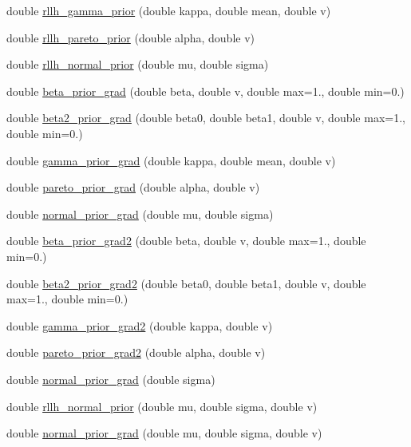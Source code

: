 \begin{DoxyCompactItemize}
double \hyperlink{namespacemappel_ac76807de851d24f1b720629ad9062cb2}{rllh\+\_\+gamma\+\_\+prior} (double kappa, double mean, double v)
\item 
double \hyperlink{namespacemappel_a2a07cb3a2c6ccd588241807747f3bd56}{rllh\+\_\+pareto\+\_\+prior} (double alpha, double v)
\item 
double \hyperlink{namespacemappel_a83c043a3c96a38aff92e40445f1ffd7a}{rllh\+\_\+normal\+\_\+prior} (double mu, double sigma)
\item 
double \hyperlink{namespacemappel_a077bd23f694399652e8e3a3be5758688}{beta\+\_\+prior\+\_\+grad} (double beta, double v, double max=1., double min=0.)
\item 
double \hyperlink{namespacemappel_a2b820140eb5c93d7d256a30fc6137ef8}{beta2\+\_\+prior\+\_\+grad} (double beta0, double beta1, double v, double max=1., double min=0.)
\item 
double \hyperlink{namespacemappel_a0f4c641d9784a4688faa26c126e28fa2}{gamma\+\_\+prior\+\_\+grad} (double kappa, double mean, double v)
\item 
double \hyperlink{namespacemappel_a39593a3b69416194cd751ce9d14c6ac3}{pareto\+\_\+prior\+\_\+grad} (double alpha, double v)
\item 
double \hyperlink{namespacemappel_a4cf075a8296209b3ad86ea5b0e1f69b3}{normal\+\_\+prior\+\_\+grad} (double mu, double sigma)
\item 
double \hyperlink{namespacemappel_a6a36b8a34be04643747e178a8358251c}{beta\+\_\+prior\+\_\+grad2} (double beta, double v, double max=1., double min=0.)
\item 
double \hyperlink{namespacemappel_af516b8782a35f0983f0184d8d907df5e}{beta2\+\_\+prior\+\_\+grad2} (double beta0, double beta1, double v, double max=1., double min=0.)
\item 
double \hyperlink{namespacemappel_a09f684e270fef9279b5eabff96e54edb}{gamma\+\_\+prior\+\_\+grad2} (double kappa, double v)
\item 
double \hyperlink{namespacemappel_ada81641eef9ad6a8741e8919ad5c13b9}{pareto\+\_\+prior\+\_\+grad2} (double alpha, double v)
\item 
double \hyperlink{namespacemappel_ab4d747ffc0e3113c61dc115210c4225f}{normal\+\_\+prior\+\_\+grad} (double sigma)
\item 
double \hyperlink{namespacemappel_acf463f0ab903ab18560ce6c1a94be694}{rllh\+\_\+normal\+\_\+prior} (double mu, double sigma, double v)
\item 
double \hyperlink{namespacemappel_a217d463069e4893cbae3574a7b91e68b}{normal\+\_\+prior\+\_\+grad} (double mu, double sigma, double v)

\end{DoxyCompactItemize}
